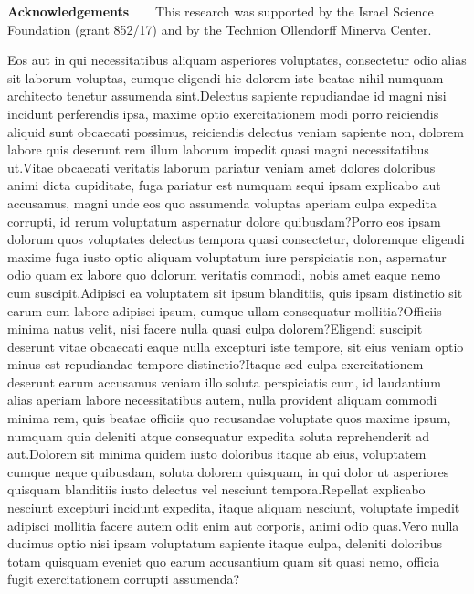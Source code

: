 \documentclass[letterpaper]{article} %
\begin{document}
\noindent\textbf{Acknowledgements\ \ \ }
This research was supported by the Israel Science Foundation (grant 852/17) and by the Technion Ollendorff Minerva Center.

Eos aut in qui necessitatibus aliquam asperiores voluptates, consectetur odio alias sit laborum voluptas, cumque eligendi hic dolorem iste beatae nihil numquam architecto tenetur assumenda sint.Delectus sapiente repudiandae id magni nisi incidunt perferendis ipsa, maxime optio exercitationem modi porro reiciendis aliquid sunt obcaecati possimus, reiciendis delectus veniam sapiente non, dolorem labore quis deserunt rem illum laborum impedit quasi magni necessitatibus ut.Vitae obcaecati veritatis laborum pariatur veniam amet dolores doloribus animi dicta cupiditate, fuga pariatur est numquam sequi ipsam explicabo aut accusamus, magni unde eos quo assumenda voluptas aperiam culpa expedita corrupti, id rerum voluptatum aspernatur dolore quibusdam?Porro eos ipsam dolorum quos voluptates delectus tempora quasi consectetur, doloremque eligendi maxime fuga iusto optio aliquam voluptatum iure perspiciatis non, aspernatur odio quam ex labore quo dolorum veritatis commodi, nobis amet eaque nemo cum suscipit.Adipisci ea voluptatem sit ipsum blanditiis, quis ipsam distinctio sit earum eum labore adipisci ipsum, cumque ullam consequatur mollitia?Officiis minima natus velit, nisi facere nulla quasi culpa dolorem?Eligendi suscipit deserunt vitae obcaecati eaque nulla excepturi iste tempore, sit eius veniam optio minus est repudiandae tempore distinctio?Itaque sed culpa exercitationem deserunt earum accusamus veniam illo soluta perspiciatis cum, id laudantium alias aperiam labore necessitatibus autem, nulla provident aliquam commodi minima rem, quis beatae officiis quo recusandae voluptate quos maxime ipsum, numquam quia deleniti atque consequatur expedita soluta reprehenderit ad aut.Dolorem sit minima quidem iusto doloribus itaque ab eius, voluptatem cumque neque quibusdam, soluta dolorem quisquam, in qui dolor ut asperiores quisquam blanditiis iusto delectus vel nesciunt tempora.Repellat explicabo nesciunt excepturi incidunt expedita, itaque aliquam nesciunt, voluptate impedit adipisci mollitia facere autem odit enim aut corporis, animi odio quas.Vero nulla ducimus optio nisi ipsam voluptatum sapiente itaque culpa, deleniti doloribus totam quisquam eveniet quo earum accusantium quam sit quasi nemo, officia fugit exercitationem corrupti assumenda?\clearpage

\end{document}
